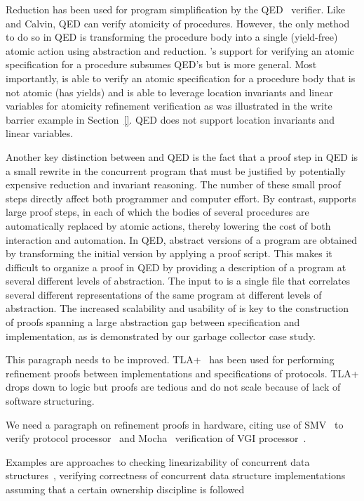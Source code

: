 Reduction has been used for program simplification by the
QED~\cite{ElmasQT09} verifier.
Like \civl and Calvin, QED can verify atomicity of procedures. However,
the only method to do so in QED is transforming the procedure body
into a single (yield-free) atomic action using abstraction and reduction. \civl's
support for verifying an atomic specification for a procedure subsumes
QED's but is more general. Most importantly, \civl is able to verify
an atomic specification for a procedure body that is not atomic (has
yields) and is able to leverage location invariants and linear
variables for atomicity
refinement verification as was illustrated in the write barrier
example in Section~\ref{}. QED does not support location invariants and linear variables. 

Another key distinction between \civl and QED is the fact that a proof step in QED is a small rewrite in the concurrent program
that must be justified by potentially expensive reduction and invariant reasoning.
The number of these small proof steps directly affect both programmer
and computer effort. 
By contrast, \civl supports large proof steps, in each of which the bodies of several procedures
are automatically replaced by atomic actions, thereby lowering the cost of both interaction and automation.
In QED, abstract versions of a program are obtained by transforming the initial
version by applying a proof script. 
This makes it difficult to organize a proof in QED by providing a
description of a program at several different levels of abstraction. 
The input to \civl is a single file that correlates several different
representations of the same program at different levels of
abstraction. 
The increased scalability and usability of \civl is key to the construction of proofs spanning a large abstraction gap
between specification and implementation, as is demonstrated by our
garbage collector case study. 

This paragraph needs to be improved.
TLA+~\cite{Lamport2004} has been used for performing refinement proofs between implementations and specifications of protocols.
TLA+ drops down to logic but proofs are tedious and do not scale because of lack of software structuring.

We need a paragraph on refinement proofs in hardware, citing use of SMV~\cite{McMillan00} to verify protocol processor~\cite{Eiriksson2000} 
and Mocha~\cite{AlurHMQRT98} verification of VGI processor~\cite{Henzinger1999}.

Examples are approaches to
checking linearizability of concurrent data
structures~\cite{tacasLin,aliLin}, 
verifying correctness of
concurrent data structure implementations assuming that a certain
ownership discipline is followed~\cite{TuronM11} 

